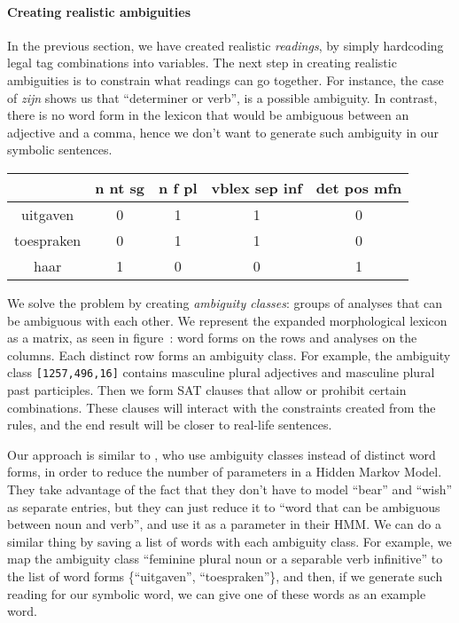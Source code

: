 \paragraph{Creating realistic ambiguities}




In the previous section, we have created realistic \emph{readings}, by simply hardcoding legal tag combinations into variables. The next step in creating realistic ambiguities is to constrain what readings can go together. For instance, the case of \emph{zijn} shows us that ``determiner or verb'', is a possible ambiguity. In contrast, there is no word form in the lexicon that would be ambiguous between an adjective and a comma, hence we don't want to generate such ambiguity in our symbolic sentences.

\begin{center}
\begin{tabular}{c|c|c|c|c}


            & n nt sg  & n f pl  &  vblex sep inf & det pos mfn  \\ \hline
uitgaven    & 0        & 1       & 1              & 0    \\ 
toespraken  & 0        & 1       & 1              & 0    \\ 
haar        & 1        & 0       & 0              & 1    \\ 


\end{tabular}
\end{center}

We solve the problem by creating \emph{ambiguity classes}: groups of analyses that can be ambiguous with each other. 
We represent the expanded morphological lexicon as a matrix, as seen in figure~: word forms on the rows and analyses on the columns. Each distinct row forms an ambiguity class. For example, the ambiguity class \verb![1257,496,16]! %
contains masculine plural adjectives and masculine plural past participles.
Then we form SAT clauses that allow or prohibit certain combinations. These clauses will interact with the constraints created from the rules, and the end result will be closer to real-life sentences.

Our approach is similar to \cite{cutting_etal92}, who use ambiguity classes instead of distinct word forms, in order to reduce the number of parameters in a Hidden Markov Model. They take advantage of the fact that they don't have to model ``bear'' and ``wish'' as separate entries, but they can just reduce it to ``word that can be ambiguous between noun and verb'', and use it as a parameter in their HMM. 
We can do a similar thing by saving a list of words with each ambiguity class. For example, we map the ambiguity class ``feminine plural noun or a separable verb infinitive'' to the list of word forms \{``uitgaven'', ``toespraken''\}, and then, if we generate such reading for our symbolic word, we can give one of these words as an example word.

